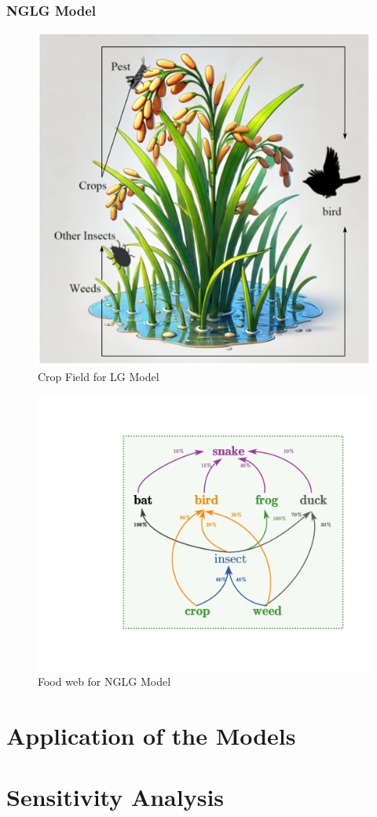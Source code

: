 \documentclass{HZNUMCM}
\begin{document}
      \subsubsection{NGLG Model}
      \begin{figure}[H]
        \centering
          \includegraphics[width=0.5\linewidth]{images/init_crop_field.png} 
          \caption{Crop Field for LG Model}
          \label{fig:LG_Field}
      \end{figure}
      \begin{figure}[H]
          \centering
          \includegraphics[width=0.8\linewidth]{images/food_web.pdf}
          \caption{Food web for NGLG Model}
          \label{fig:NGLG_FoodWeb}
      \end{figure}
        
  \section{Application of the Models}

  \section{Sensitivity Analysis}
\end{document}
